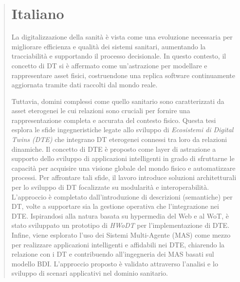 \documentclass[12pt,a4paper,openright,twoside]{book}
\begin{document}


\let\origcleardoublepage\cleardoublepage
\let\cleardoublepage\clearpage

\frontmatter

\let\cleardoublepage\origcleardoublepage



\begin{abstract}	

\section*{Italiano}

La digitalizzazione della sanità è vista come una evoluzione necessaria per migliorare efficienza e qualità dei sistemi sanitari, aumentando la tracciabilità e supportando il processo decisionale.
%
%
In questo contesto, il concetto di \ac{DT} si è affermato come un'astrazione per modellare e rappresentare asset fisici, costruendone una replica software continuamente aggiornata tramite dati raccolti dal mondo reale.

Tuttavia, domini complessi come quello sanitario sono caratterizzati da asset eterogenei le cui relazioni sono cruciali per fornire una rappresentazione completa e accurata del contesto fisico.
%
Questa tesi esplora le sfide ingegneristiche legate allo sviluppo di \emph{Ecosistemi di Digital Twins (DTE)} che integrano \ac{DT} eterogenei connessi tra loro da relazioni dinamiche.
Il concetto di \acs{DTE} è proposto come layer di astrazione a supporto dello sviluppo di applicazioni intelligenti in grado di sfruttarne le capacità per acquisire una visione globale del mondo fisico e automatizzare processi.
%
Per affrontare tali sfide, il lavoro introduce soluzioni architetturali per lo sviluppo di \ac{DT} focalizzate su modularità e interoperabilità.
%
L’approccio è completato dall'introduzione di descrizioni (semantiche) per \ac{DT}, volte a supportare sia la gestione operativa che l'integrazione nei \acs{DTE}.
%
Ispirandosi alla natura basata su hypermedia del Web e al \acl{WoT}, è stato sviluppato un prototipo di \emph{\ac{HWoDT}} per l'implementazione di \acs{DTE}.
%
Infine, viene esplorato l'uso dei Sistemi Multi-Agente (MAS) come mezzo per realizzare applicazioni intelligenti e affidabili nei \acs{DTE}, chiarendo la relazione con i \ac{DT} e contribuendo all'ingegneria dei \acs{MAS} basati sul modello \acl{BDI}.
%
L'approccio proposto è validato attraverso l'analisi e lo sviluppo di scenari applicativi nel dominio sanitario.




\end{abstract}
\end{document}
